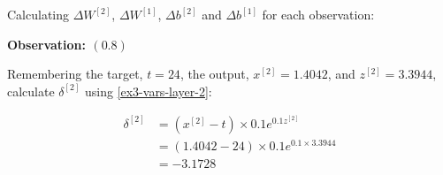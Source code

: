 \documentclass[12pt]{article}
\begin{document}
\begin{enumerate}[leftmargin=\labelsep]
          Calculating $\Delta W^{[2]}$, $\Delta W^{[1]}$, $\Delta b^{[2]}$ and $\Delta b^{[1]}$
          for each observation:

          \begin{paracol}{3}
              \begin{center}
                  \textbf{Observation: $(0.8)$}
              \end{center}

              Remembering the target, $t = 24$,
              the output, $x^{[2]} = 1.4042$,
              and $z^{[2]} = 3.3944$,
              calculate $\delta^{[2]}$ using \eqref{ex3-vars-layer-2}:

              \begin{footnotesize}
                  $$
                      \begin{aligned}
                          \delta^{[2]} & = \left(x^{[2]} - t\right) \times 0.1 e^{0.1 z^{[2]}} \\
                                       & = (1.4042 - 24) \times 0.1 e^{0.1 \times 3.3944}      \\
                                       & = -3.1728
                      \end{aligned}
                  $$
              \end{footnotesize}


\end{paracol}
\end{enumerate}
\end{document}

